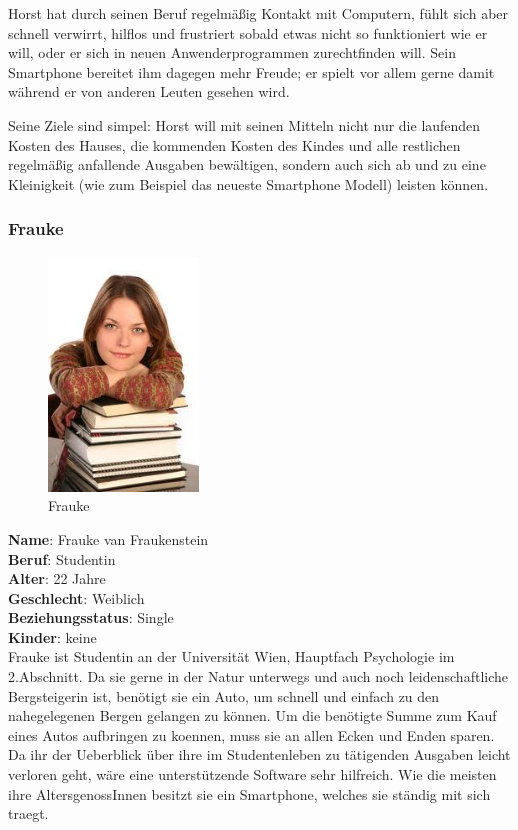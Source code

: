 Horst hat durch seinen Beruf regelm\"a\ss ig Kontakt mit Computern, f\"uhlt sich aber schnell verwirrt, hilflos und
frustriert sobald etwas nicht so funktioniert wie er will, oder er sich in neuen Anwenderprogrammen zurechtfinden will.
Sein Smartphone bereitet ihm dagegen mehr Freude; er spielt vor allem gerne damit w\"ahrend
er von anderen Leuten gesehen wird.

Seine Ziele sind simpel: Horst will mit seinen Mitteln nicht nur die laufenden Kosten des Hauses,
die kommenden Kosten des Kindes und alle restlichen regelm\"a\ss ig anfallende Ausgaben bew\"altigen,
sondern auch sich ab und zu eine Kleinigkeit (wie zum Beispiel das neueste Smartphone Modell) leisten k\"onnen.

\newpage
\subsubsection{Frauke}

\begin{figure}
\centering
\includegraphics[width=4cm]{img/frauke}
\caption{Frauke}
\label{fig:frauke}
\end{figure}

\textbf{Name}: Frauke van Fraukenstein \\
\textbf{Beruf}: Studentin \\
\textbf{Alter}: 22 Jahre \\
\textbf{Geschlecht}: Weiblich \\
\textbf{Beziehungsstatus}: Single \\
\textbf{Kinder}: keine \\

Frauke ist Studentin an der Universit\"at Wien, Hauptfach Psychologie im 2.Abschnitt.
Da sie gerne in der Natur unterwegs und auch noch leidenschaftliche Bergsteigerin ist,
ben\"otigt sie ein Auto, um schnell und einfach zu den nahegelegenen Bergen gelangen
zu k\"onnen. Um die ben\"otigte Summe zum Kauf eines Autos aufbringen zu koennen, muss
sie an allen Ecken und Enden sparen. Da ihr der Ueberblick \"uber ihre im Studentenleben
zu t\"atigenden Ausgaben leicht verloren geht, w\"are eine unterst\"utzende Software sehr
hilfreich. Wie die meisten ihre AltersgenossInnen besitzt sie ein Smartphone, welches
sie st\"andig mit sich traegt.

